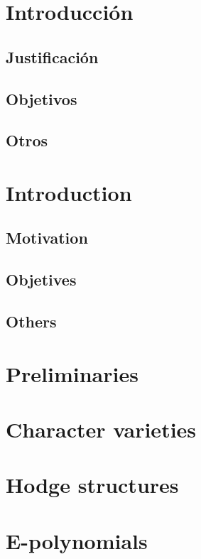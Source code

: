 \documentclass[12pt,oneside]{book}
\theoremstyle{definition}
\begin{document}
\newpage
\chapter*{Introducción}
\section*{Justificación}
\section*{Objetivos}
\section*{Otros}

\newpage
\chapter*{Introduction}
\section*{Motivation}
\section*{Objetives}
\section*{Others}




\newpage
\chapter{Preliminaries}


\newpage
\chapter{Character varieties}

\newpage

\chapter{Hodge structures}


\newpage
\chapter{E-polynomials}

\end{document}
